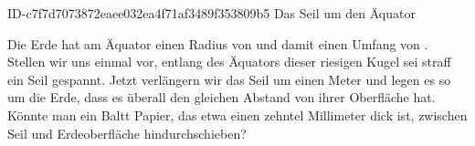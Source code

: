 \begin{exercise}
      {ID-c7f7d7073872eaee032ea4f71af3489f353809b5}
      {Das Seil um den Äquator}
  \ifproblem\problem\par
    Die Erde hat am Äquator einen Radius von  und damit einen
    Umfang von . Stellen wir uns einmal vor,
    entlang des Äquators dieser riesigen Kugel sei straff ein Seil gespannt.
    Jetzt verlängern wir das Seil um einen Meter und legen es so um die Erde,
    dass es überall den gleichen Abstand von ihrer Oberfläche hat.
    Könnte man ein Baltt Papier, das etwa einen zehntel Millimeter dick ist,
    zwischen Seil und Erdeoberfläche hindurchschieben?
  \fi
\end{exercise}
